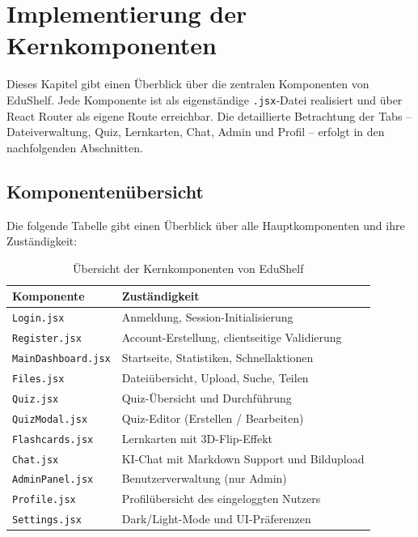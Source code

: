 \section{Implementierung der Kernkomponenten}

Dieses Kapitel gibt einen Überblick über die zentralen Komponenten von EduShelf. Jede Komponente ist als eigenständige \texttt{.jsx}-Datei realisiert und über React Router als eigene Route erreichbar. Die detaillierte Betrachtung der Tabs -- Dateiverwaltung, Quiz, Lernkarten, Chat, Admin und Profil -- erfolgt in den nachfolgenden Abschnitten.



\subsection{Komponentenübersicht}

Die folgende Tabelle gibt einen Überblick über alle Hauptkomponenten und ihre Zuständigkeit:
\newline

\begin{table}[h]
\centering
\begin{tabular}{|l|l|}
\hline
\textbf{Komponente} & \textbf{Zuständigkeit} \\
\hline
\texttt{Login.jsx} & Anmeldung, Session-Initialisierung \\
\texttt{Register.jsx} & Account-Erstellung, clientseitige Validierung \\
\texttt{MainDashboard.jsx} & Startseite, Statistiken, Schnellaktionen \\
\texttt{Files.jsx} & Dateiübersicht, Upload, Suche, Teilen \\
\texttt{Quiz.jsx} & Quiz-Übersicht und Durchführung \\
\texttt{QuizModal.jsx} & Quiz-Editor (Erstellen / Bearbeiten) \\
\texttt{Flashcards.jsx} & Lernkarten mit 3D-Flip-Effekt \\
\texttt{Chat.jsx} & KI-Chat mit Markdown Support und Bildupload \\
\texttt{AdminPanel.jsx} & Benutzerverwaltung (nur Admin) \\
\texttt{Profile.jsx} & Profilübersicht des eingeloggten Nutzers \\
\texttt{Settings.jsx} & Dark/Light-Mode und UI-Präferenzen \\
\hline
\end{tabular}
\caption{Übersicht der Kernkomponenten von EduShelf}
\label{tab:komponenten}
\end{table}
\newpage

